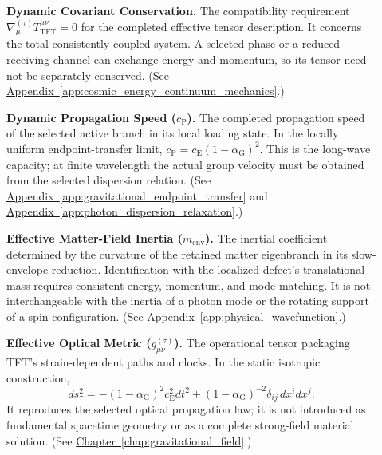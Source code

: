 \begin{description}
\item[] \begin{minipage}[t]{\linewidth}
\textbf{Dynamic Covariant Conservation.} The compatibility requirement $\nabla_\mu^{(\tau)}T_{\mathrm{TFT}}^{\mu\nu}=0$ for the completed effective tensor description. It concerns the total consistently coupled system. A selected phase or a reduced receiving channel can exchange energy and momentum, so its tensor need not be separately conserved.
(See \hyperref[app:cosmic_energy_continuum_mechanics]{Appendix~\ref*{app:cosmic_energy_continuum_mechanics}}.)
\end{minipage}

\item[] \begin{minipage}[t]{\linewidth}
\textbf{Dynamic Propagation Speed ($c_{\mathrm P}$).} The completed propagation speed of the selected active branch in its local loading state. In the locally uniform endpoint-transfer limit, $c_{\mathrm P}=c_{\mathrm E}(1-\alpha_{\mathrm G})^2$. This is the long-wave capacity; at finite wavelength the actual group velocity must be obtained from the selected dispersion relation.
(See \hyperref[app:gravitational_endpoint_transfer]{Appendix~\ref*{app:gravitational_endpoint_transfer}} and \hyperref[app:photon_dispersion_relaxation]{Appendix~\ref*{app:photon_dispersion_relaxation}}.)
\end{minipage}

\item[] \begin{minipage}[t]{\linewidth}
\textbf{Effective Matter-Field Inertia ($m_{\mathrm{env}}$).} The inertial coefficient determined by the curvature of the retained matter eigenbranch in its slow-envelope reduction. Identification with the localized defect's translational mass requires consistent energy, momentum, and mode matching. It is not interchangeable with the inertia of a photon mode or the rotating support of a spin configuration.
(See \hyperref[app:physical_wavefunction]{Appendix~\ref*{app:physical_wavefunction}}.)
\end{minipage}

\item[] \begin{minipage}[t]{\linewidth}
\textbf{Effective Optical Metric ($g_{\mu\nu}^{(\tau)}$).} The operational tensor packaging TFT's strain-dependent paths and clocks. In the static isotropic construction,
\[
 ds_\tau^2=-(1-\alpha_{\mathrm G})^2c_{\mathrm E}^2dt^2
 +(1-\alpha_{\mathrm G})^{-2}\delta_{ij}\,dx^i dx^j.
\]
It reproduces the selected optical propagation law; it is not introduced as fundamental spacetime geometry or as a complete strong-field material solution.
(See \hyperref[chap:gravitational_field]{Chapter~\ref*{chap:gravitational_field}}.)
\end{minipage}


\end{description}
